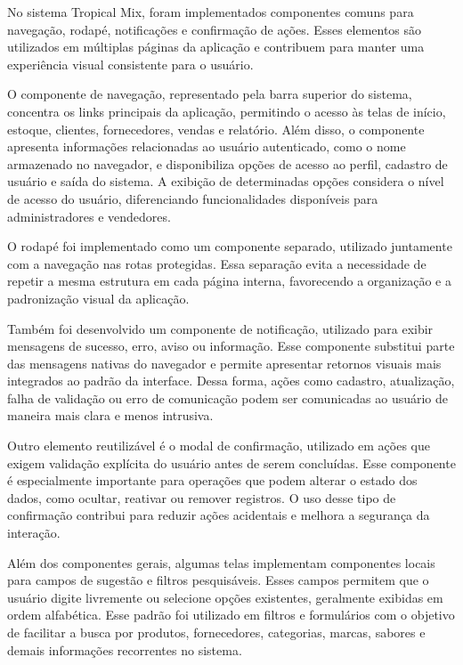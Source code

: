 No sistema Tropical Mix, foram implementados componentes comuns para navegação, rodapé, notificações e confirmação de ações. Esses elementos são utilizados em múltiplas páginas da aplicação e contribuem para manter uma experiência visual consistente para o usuário.

O componente de navegação, representado pela barra superior do sistema, concentra os links principais da aplicação, permitindo o acesso às telas de início, estoque, clientes, fornecedores, vendas e relatório. Além disso, o componente apresenta informações relacionadas ao usuário autenticado, como o nome armazenado no navegador, e disponibiliza opções de acesso ao perfil, cadastro de usuário e saída do sistema. A exibição de determinadas opções considera o nível de acesso do usuário, diferenciando funcionalidades disponíveis para administradores e vendedores.

O rodapé foi implementado como um componente separado, utilizado juntamente com a navegação nas rotas protegidas. Essa separação evita a necessidade de repetir a mesma estrutura em cada página interna, favorecendo a organização e a padronização visual da aplicação.

Também foi desenvolvido um componente de notificação, utilizado para exibir mensagens de sucesso, erro, aviso ou informação. Esse componente substitui parte das mensagens nativas do navegador e permite apresentar retornos visuais mais integrados ao padrão da interface. Dessa forma, ações como cadastro, atualização, falha de validação ou erro de comunicação podem ser comunicadas ao usuário de maneira mais clara e menos intrusiva.

Outro elemento reutilizável é o modal de confirmação, utilizado em ações que exigem validação explícita do usuário antes de serem concluídas. Esse componente é especialmente importante para operações que podem alterar o estado dos dados, como ocultar, reativar ou remover registros. O uso desse tipo de confirmação contribui para reduzir ações acidentais e melhora a segurança da interação.

Além dos componentes gerais, algumas telas implementam componentes locais para campos de sugestão e filtros pesquisáveis. Esses campos permitem que o usuário digite livremente ou selecione opções existentes, geralmente exibidas em ordem alfabética. Esse padrão foi utilizado em filtros e formulários com o objetivo de facilitar a busca por produtos, fornecedores, categorias, marcas, sabores e demais informações recorrentes no sistema.

